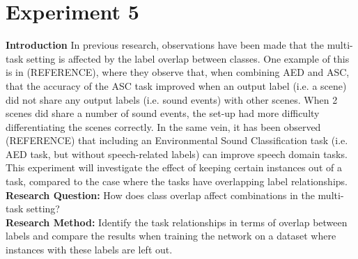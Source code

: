 \section{Experiment 5}

\textbf{Introduction}
In previous research, observations have been made that the multi-task setting is affected by the label overlap between classes. One example of this is in (REFERENCE), where they observe that, when combining AED and ASC, that the accuracy of the ASC task improved when an output label (i.e. a scene) did not share any output labels (i.e. sound events) with other scenes. When 2 scenes did share a number of sound events, the set-up had more difficulty differentiating the scenes correctly. In the same vein, it has been observed (REFERENCE) that including an Environmental Sound Classification task (i.e. AED task, but without speech-related labels) can improve speech domain tasks. This experiment will investigate the effect of keeping certain instances out of a task, compared to the case where the tasks have overlapping label relationships. \\

\textbf{Research Question:} How does class overlap affect combinations in the multi-task setting?\\

\textbf{Research Method:} Identify the task relationships in terms of overlap between labels and compare the results when training the network on a dataset where instances with these labels are left out.\\
